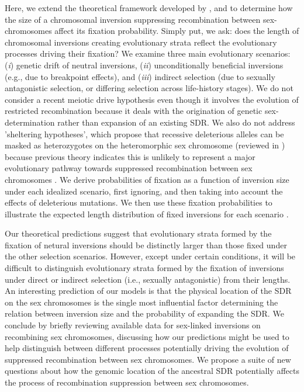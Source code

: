 \documentclass{article}
\begin{document}
Here, we extend the theoretical framework developed by \citet{vanValenLevins1968, Santos1986}, and \citet{ConnallonOlito2020} to determine how the size of a chromosomal inversion suppressing recombination between sex-chromosomes affect its fixation probability. Simply put, we ask: does the length of chromosomal inversions creating evolutionary strata reflect the evolutionary processes driving their fixation? We examine three main evolutionary scenarios: ({\itshape i}) genetic drift of neutral inversions, ({\itshape ii}) unconditionally beneficial inversions (e.g., due to breakpoint effects), and ({\itshape iii}) indirect selection (due to sexually antagonistic selection, or differing selection across life-history stages). We do not consider a recent meiotic drive hypothesis \citet{UbedaPatten2010} even though it involves the evolution of restricted recombination because it deals with the origination of genetic sex-determination rather than expansion of an existing SDR. We also do not address 'sheltering hypotheses', which propose that recessive deleterious alleles can be masked as heterozygotes on the heteromorphic sex chromosome (reviewed in \citealt{Ironside2010, Ponnikas2018, Charlesworth2017}) because previous theory indicates this is unlikely to represent a major evolutionary pathway towards suppressed recombination between sex chromosomes \citep{Fisher1935, Olito2020}. We derive probabilities of fixation as a function of inversion size under each idealized scenario, first ignoring, and then taking into account the effects of deleterious mutations. We then use these fixation probabilities to illustrate the expected length distribution of fixed inversions for each scenario \citep[after][]{vanValenLevins1968,Santos1986}. 

Our theoretical predictions suggest that evolutionary strata formed by the fixation of netural inversions should be distinctly larger than those fixed under the other selection scenarios. However, except under certain conditions, it will be difficult to distinguish evolutionary strata formed by the fixation of inversions under direct or indirect selection (i.e., sexually antagonistic) from their lengths. An interesting prediction of our models is that the physical location of the SDR on the sex chromosomes is the single most influential factor determining the relation between inversion size and the probability of expanding the SDR. We conclude by briefly reviewing available data for sex-linked inversions on recombining sex chromosomes, discussing how our predictions might be used to help distinguish between different processes potentially driving the evolution of suppressed recombination between sex chromosomes. We propose a suite of new questions about how the genomic location of the ancestral SDR potentially affects the process of recombination suppression between sex chromosomes.
\end{document}
